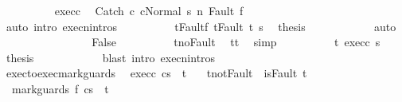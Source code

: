 \begin{isabellebody}
\isanewline
\ \ \ \ \ \ \ \ \isamarkupfalse%
\ exec{\isacharunderscore}c{}\ \isamarkupfalse%
\ {\isachardoublequoteopen}{\isasymGamma}{\isasymturnstile}{\isasymlangle}Catch\ c{}\ c{}{\isacharcomma}Normal\ s{\isacharprime}{\isasymrangle}\ {\isacharequal}n{\isasymRightarrow}\ Fault\ f{\isacharprime}{\isachardoublequoteclose}\ \isanewline
\ \ \ \ \ \ \ \ \ \ \isamarkupfalse%
\ {\isacharparenleft}auto\ intro{\isacharcolon}\ execn{\isachardot}intros{\isacharparenright}\isanewline
\ \ \ \ \ \ \ \ \isamarkupfalse%
\ t{\isacharprime}{\isacharunderscore}Fault{\isacharunderscore}f\ t{\isacharprime}{\isacharunderscore}Fault\ t{\isacharprime}\ s\ \isamarkupfalse%
\ {\isacharquery}thesis\isanewline
\ \ \ \ \ \ \ \ \ \ \isamarkupfalse%
\ auto\isanewline
\ \ \ \ \ \ \isamarkupfalse%
\isanewline
\ \ \ \ \ \ \ \ \isamarkupfalse%
\ False\isanewline
\ \ \ \ \ \ \ \ \isamarkupfalse%
\ t{\isacharprime}{\isacharunderscore}noFault\ \isamarkupfalse%
\ {\isachardoublequoteopen}t{\isacharprime}{\isacharequal}t{\isachardoublequoteclose}\ \isamarkupfalse%
\ simp\isanewline
\ \ \ \ \ \ \ \ \isamarkupfalse%
\ t\ exec{\isacharunderscore}c{}\ s\ \isamarkupfalse%
\ {\isacharquery}thesis\isanewline
\ \ \ \ \ \ \ \ \ \ \isamarkupfalse%
\ {\isacharparenleft}blast\ intro{\isacharcolon}\ execn{\isachardot}intros{\isacharparenright}\isanewline
\ \ \ \ \ \ \isamarkupfalse%
\isanewline
\ \ \ \ \isamarkupfalse%
\isanewline
\ \ \isamarkupfalse%
\isanewline
{}\isamarkupfalse%
%
\endisatagproof
{\isafoldproof}%
%
\isadelimproof
\isanewline
%
\endisadelimproof
\isanewline
{}\isamarkupfalse%
\ exec{\isacharunderscore}to{\isacharunderscore}exec{\isacharunderscore}mark{\isacharunderscore}guards{\isacharcolon}\isanewline
\ \ exec{\isacharunderscore}c{\isacharcolon}\ {\isachardoublequoteopen}{\isasymGamma}{\isasymturnstile}{\isasymlangle}c{\isacharcomma}s{\isasymrangle}\ {\isasymRightarrow}\ t{\isachardoublequoteclose}\ \isanewline
\ \ t{\isacharunderscore}not{\isacharunderscore}Fault{\isacharcolon}\ {\isachardoublequoteopen}{\isasymnot}\ isFault\ t{\isachardoublequoteclose}\isanewline
\ \ {\isachardoublequoteopen}{\isasymGamma}{\isasymturnstile}{\isasymlangle}mark{\isacharunderscore}guards\ f\ c{\isacharcomma}s{\isasymrangle}\ {\isasymRightarrow}\ t\ {\isachardoublequoteclose}\isanewline

\end{isabellebody}
